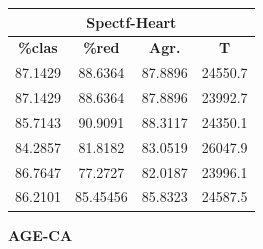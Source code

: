 \documentclass[11pt,a4paper]{article}
\theoremstyle{definition}
\begin{document}
\begin{tabbing}
{		\begin{tabular}{|c|c|c|c|}
			\hline
			\multicolumn{4}{|c|}{\textbf{Spectf-Heart}} \\ \hline
			\textbf{\%clas} & \textbf{\%red} & \textbf{Agr.} & \textbf{T} \\ \hline 
			87.1429 & 88.6364 & 87.8896 & 24550.7\\ \hline
87.1429 & 88.6364 & 87.8896 & 23992.7\\ \hline
85.7143 & 90.9091 & 88.3117 & 24350.1\\ \hline
84.2857 & 81.8182 & 83.0519 & 26047.9\\ \hline
86.7647 & 77.2727 & 82.0187 & 23996.1\\ \hline
86.2101 & 85.45456 & 85.8323 & 24587.5\\ \hline
		\end{tabular}
		}
	\end{tabbing}
	
	\textbf{AGE-CA}
	
\end{document}
